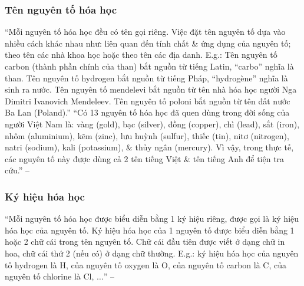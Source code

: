 \documentclass{article}
\numberwithin{equation}{section}
\begin{document}
\subsubsection{Tên nguyên tố hóa học}
``Mỗi nguyên tố hóa học đều có tên gọi riêng. Việc đặt tên nguyên tố dựa vào nhiều cách khác nhau như: liên quan đến tính chất \& ứng dụng của nguyên tố; theo tên các nhà khoa học hoặc theo tên các địa danh. E.g.: Tên nguyên tố carbon (thành phần chính của than) bắt nguồn từ tiếng Latin, ``carbo'' nghĩa là than. Tên nguyên tố hydrogen bắt nguồn từ tiếng Pháp, ``hydrogène'' nghĩa là sinh ra nước. Tên nguyên tố mendelevi bắt nguồn từ tên nhà hóa học người Nga Dimitri Ivanovich Mendeleev. Tên nguyên tố poloni bắt nguồn từ tên đất nước Ba Lan (Poland).'' ``Có 13 nguyên tố hóa học đã quen dùng trong đời sống của người Việt Nam là: vàng (gold), bạc (silver), đồng (copper), chì (lead), sắt (iron), nhôm (aluminium), kẽm (zinc), lưu huỳnh (sulfur), thiếc (tin), nitơ (nitrogen), natri (sodium), kali (potassium), \& thủy ngân (mercury). Vì vậy, trong thực tế, các nguyên tố này được dùng cả 2 tên tiếng Việt \& tên tiếng Anh để tiện tra cứu.'' -- \cite[p. 16]{SGK_KHTN_7_Canh_Dieu}

\subsubsection{Ký hiệu hóa học}
``Mỗi nguyên tố hóa học được biểu diễn bằng 1 ký hiệu riêng, được gọi là ký hiệu hóa học của nguyên tố. Ký hiệu hóa học của 1 nguyên tố được biểu diễn bằng 1 hoặc 2 chữ cái trong tên nguyên tố. Chữ cái đầu tiên được viết ở dạng chữ in hoa, chữ cái thứ 2 (nếu có) ở dạng chữ thường. E.g.: ký hiệu hóa học của nguyên tố hydrogen là H, của nguyên tố oxygen là O, của nguyên tố carbon là C, của nguyên tố chlorine là Cl, $\ldots$''  -- \cite[pp. 16--17]{SGK_KHTN_7_Canh_Dieu}
\end{document}

